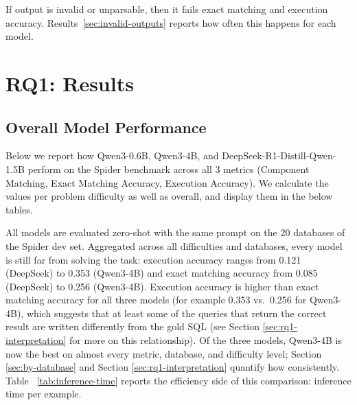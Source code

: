 If output is invalid or unparsable, then it fails exact matching and execution accuracy. Results~\ref{sec:invalid-outputs} reports how often this happens for each model.

\section{RQ1: Results}
\label{sec:rq1-results}

\subsection{Overall Model Performance}
\label{sec:overall-performance}

Below we report how Qwen3-0.6B, Qwen3-4B, and DeepSeek-R1-Distill-Qwen-1.5B perform on the Spider benchmark across all 3 metrics (Component Matching, Exact Matching Accuracy, Execution Accuracy). We calculate the values per problem difficulty as well as overall, and display them in the below tables.

\begin{table}[H]
\centering
\footnotesize
\caption{Overall performance summary, aggregated across all difficulties (all 1034 problems). Component matching is accuracy / recall / F1 (macro-averaged, see the note on Table~\ref{tab:difficulty-component} in \ref{sec:rq1-interpretation}). Per-difficulty breakdowns are in Tables~\ref{tab:difficulty-component}--\ref{tab:difficulty-execution}.}
\label{tab:overall-performance}
\end{table}

All models are evaluated zero-shot with the same prompt on the 20 databases of the Spider dev set. Aggregated across all difficulties and databases, every model is still far from solving the task: execution accuracy ranges from 0.121 (DeepSeek) to 0.353 (Qwen3-4B) and exact matching accuracy from 0.085 (DeepSeek) to 0.256 (Qwen3-4B). Execution accuracy is higher than exact matching accuracy for all three models (for example 0.353 vs.\ 0.256 for Qwen3-4B), which suggests that at least some of the queries that return the correct result are written differently from the gold SQL (see Section \ref{sec:rq1-interpretation} for more on this relationship). Of the three models, Qwen3-4B is now the best on almost every metric, database, and difficulty level; Section \ref{sec:by-database} and Section \ref{sec:rq1-interpretation} quantify how consistently. Table ~\ref{tab:inference-time} reports the efficiency side of this comparison: inference time per example.

